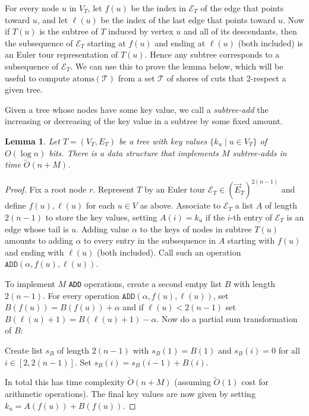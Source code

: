 \documentclass[10pt,a4paper]{article}
\newcommand{\Tcal}{\mathcal{T}}
\newcommand{\atoms}{\mathrm{atoms}}
\newcommand{\tO}{\tilde O}
\newcommand{\Ecal}{\mathcal{E}}
\newcommand{\1}{\mathbf{1}}
\newtheorem{lemma}[theorem]{Lemma}
\theoremstyle{definition}
\begin{document}
For every node $u$ in $V_T$, let $f(u)$ be the index in $\Ecal_T$ of the edge that points toward $u$, and let $\ell(u)$ be the index of the last edge that points toward $u$.
Now if $T(u)$ is the subtree of $T$ induced by vertex $u$ and all of its descendants, then the subsequence of $\Ecal_T$ starting at $f(u)$ and ending at $\ell(u)$ (both included) is an Euler tour representation of $T(u)$.
Hence any subtree corresponds to a subsequence of $\Ecal_T$.
We can use this to prove the lemma below, which will be useful to compute $\atoms(\Tcal)$ from a set $\Tcal$ of shores of cuts that 2-respect a given tree.

Given a tree whose nodes have some key value, we call a \emph{subtree-add} the increasing or decreasing of the key value in a subtree by some fixed amount.

\begin{lemma} \label{lem:euler-tree}
Let $T=(V_T,E_T)$ be a tree with key values $\{k_u \mid u \in V_T\}$ of $O(\log n)$ bits.
There is a data structure that implements $M$ subtree-adds in time $\tO(n + M)$.
\end{lemma}
\begin{proof}
Fix a root node $r$.
Represent $T$ by an Euler tour $\Ecal_T \in (\vec E_T)^{2(n-1)}$ and define $f(u),\ell(u)$ for each $u \in V$ as above.
Associate to $\Ecal_T$ a list $A$ of length $2(n-1)$ to store the key values, setting $A(i) = k_u$ if the $i$-th entry of $\Ecal_T$ is an edge whose tail is $u$.
Adding value $\alpha$ to the keys of nodes in subtree $T(u)$ amounts to adding $\alpha$ to every entry in the subsequence in $A$ starting with $f(u)$ and ending with $\ell(u)$ (both included).
Call such an operation $\texttt{ADD}(\alpha,f(u),\ell(u))$.

To implement $M$ \texttt{ADD} operations, create a second emtpy list $B$ with length $2(n-1)$.
For every operation $\texttt{ADD}(\alpha,f(u),\ell(u))$, set $B(f(u)) = B(f(u)) + \alpha$ and if $\ell(u) < 2(n-1)$ set $B(\ell(u)+1) = B(\ell(u)+1) - \alpha$.
Now do a partial sum transformation of $B$:
\begin{algorithmic}[1]
\State
Create list $s_B$ of length $2(n-1)$ with $s_B(1) = B(1)$ and $s_B(i) = 0$ for all $i \in [2,2(n-1)]$.
\State
Set $s_B(i) = s_B(i-1) + B(i)$.
\EndFor
\end{algorithmic}
In total this has time complexity $\tO(n + M)$ (assuming $\tO(1)$ cost for arithmetic operations).
The final key values are now given by setting $k_u = A(f(u)) + B(f(u))$.
\end{proof}
\end{document}
